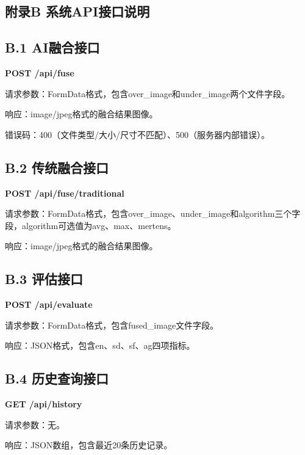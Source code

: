 \begin{appendix}
\section*{附录B 系统API接口说明}

\subsection*{B.1 AI融合接口}

\textbf{POST /api/fuse}

请求参数：FormData格式，包含over\_image和under\_image两个文件字段。

响应：image/jpeg格式的融合结果图像。

错误码：400（文件类型/大小/尺寸不匹配）、500（服务器内部错误）。

\subsection*{B.2 传统融合接口}

\textbf{POST /api/fuse/traditional}

请求参数：FormData格式，包含over\_image、under\_image和algorithm三个字段，algorithm可选值为avg、max、mertens。

响应：image/jpeg格式的融合结果图像。

\subsection*{B.3 评估接口}

\textbf{POST /api/evaluate}

请求参数：FormData格式，包含fused\_image文件字段。

响应：JSON格式，包含en、sd、sf、ag四项指标。

\subsection*{B.4 历史查询接口}

\textbf{GET /api/history}

请求参数：无。

响应：JSON数组，包含最近20条历史记录。
\end{appendix}

